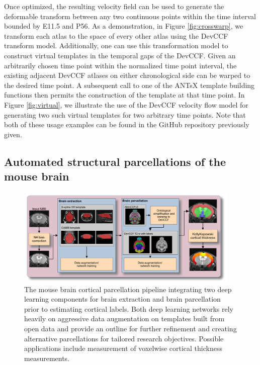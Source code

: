 \documentclass[
  12pt,
]{article}
\begin{document}
Once optimized, the resulting velocity field can be used to generate the
deformable transform between any two continuous points within the time
interval bounded by E11.5 and P56. As a demonstration, in Figure
\ref{fig:crosswarp}, we transform each atlas to the space of every other
atlas using the DevCCF transform model. Additionally, one can use this
transformation model to construct virtual templates in the temporal gaps
of the DevCCF. Given an arbitrarily chosen time point within the
normalized time point interval, the existing adjacent DevCCF atlases on
either chronological side can be warped to the desired time point. A
subsequent call to one of the ANTsX template building functions then
permits the construction of the template at that time point. In Figure
\ref{fig:virtual}, we illustrate the use of the DevCCF velocity flow
model for generating two such virtual templates for two arbitrary time
points. Note that both of these usage examples can be found in the
GitHub repository previously given.

\subsection{Automated structural parcellations of the mouse
brain}\label{automated-structural-parcellations-of-the-mouse-brain-1}

\begin{figure}
\centering
\includegraphics[width=0.95\textwidth]{Figures/mousePipeline.pdf}
\caption{The mouse brain cortical parcellation pipeline integrating two deep
learning components for brain extraction and brain parcellation prior to
estimating cortical labels. Both deep learning networks rely heavily on
aggressive data augmentation on templates built from open data and provide an
outline for further refinement and creating alternative parcellations for
tailored research objectives.  Possible applications include measurement
of voxelwise cortical thickness measurements.}
\label{fig:mouseKK}
\end{figure}
\end{document}

